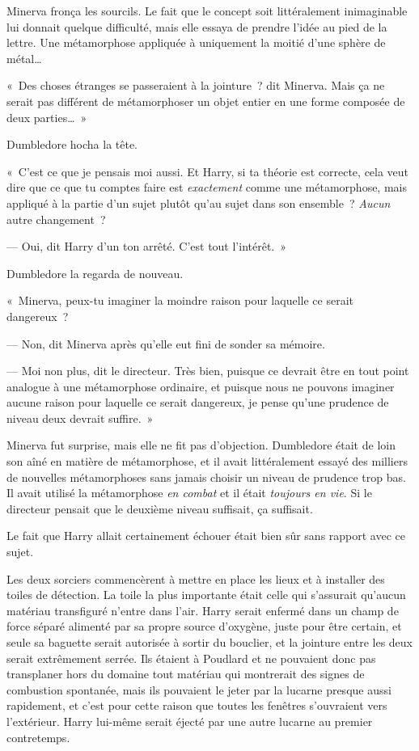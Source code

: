 Minerva fronça les sourcils.
Le fait que le concept soit littéralement inimaginable lui donnait quelque difficulté, mais elle essaya de prendre l'idée au pied de la lettre.
Une métamorphose appliquée à uniquement la moitié d'une sphère de métal…

«~Des choses étranges se passeraient à la jointure~? dit Minerva.
Mais ça ne serait pas différent de métamorphoser un objet entier en une forme composée de deux parties…~»

Dumbledore hocha la tête.

«~C'est ce que je pensais moi aussi.
Et Harry, si ta théorie est correcte, cela veut dire que ce que tu comptes faire est \emph{exactement} comme une métamorphose, mais appliqué à la partie d'un sujet plutôt qu'au sujet dans son ensemble~?
\emph{Aucun} autre changement~?

--- Oui, dit Harry d'un ton arrêté.
C'est tout l'intérêt.~»

Dumbledore la regarda de nouveau.

«~Minerva, peux-tu imaginer la moindre raison pour laquelle ce serait dangereux~?

--- Non, dit Minerva après qu'elle eut fini de sonder sa mémoire.

--- Moi non plus, dit le directeur.
Très bien, puisque ce devrait être en tout point analogue à une métamorphose ordinaire, et puisque nous ne pouvons imaginer aucune raison pour laquelle ce serait dangereux, je pense qu'une prudence de niveau deux devrait suffire.~»

Minerva fut surprise, mais elle ne fit pas d'objection.
Dumbledore était de loin son aîné en matière de métamorphose, et il avait littéralement essayé des milliers de nouvelles métamorphoses sans jamais choisir un niveau de prudence trop bas.
Il avait utilisé la métamorphose \emph{en combat} et il était \emph{toujours en vie}.
Si le directeur pensait que le deuxième niveau suffisait, ça suffisait.

Le fait que Harry allait certainement échouer était bien sûr sans rapport avec ce sujet.

Les deux sorciers commencèrent à mettre en place les lieux et à installer des toiles de détection.
La toile la plus importante était celle qui s'assurait qu'aucun matériau transfiguré n'entre dans l'air.
Harry serait enfermé dans un champ de force séparé alimenté par sa propre source d'oxygène, juste pour être certain, et seule sa baguette serait autorisée à sortir du bouclier, et la jointure entre les deux serait extrêmement serrée.
Ils étaient à Poudlard et ne pouvaient donc pas transplaner hors du domaine tout matériau qui montrerait des signes de combustion spontanée, mais ils pouvaient le jeter par la lucarne presque aussi rapidement, et c'est pour cette raison que toutes les fenêtres s'ouvraient vers l'extérieur.
Harry lui-même serait éjecté par une autre lucarne au premier contretemps.


